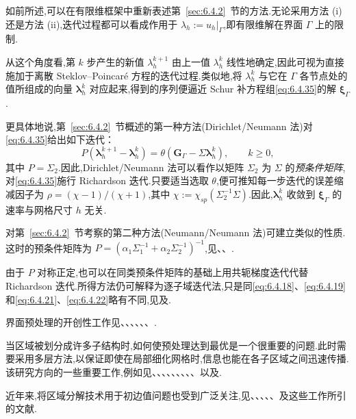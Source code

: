 如前所述,可以在有限维框架中重新表述第~\ref{sec:6.4.2}~节的方法.无论采用方法 (i) 还是方法 (ii),迭代过程都可以看成作用于 \(\lambda_h:=u_h|_\Gamma\),即有限维解在界面 \(\Gamma\) 上的限制.

从这个角度看,第 \(k\) 步产生的新值 \(\lambda_h^{k+1}\) 由上一值 \(\lambda_h^k\) 线性地确定,因此可视为直接施加于离散 Steklov--Poincaré 方程的迭代过程.类似地,将 \(\lambda_h^k\) 与它在 \(\Gamma\) 各节点处的值所组成的向量 \(\boldsymbol{\lambda}_h^k\) 对应起来,得到的序列便逼近 Schur 补方程组\eqref{eq:6.4.35}的解 \(\boldsymbol{\xi}_\Gamma\).

更具体地说,第~\ref{sec:6.4.2}~节概述的第一种方法(Dirichlet/Neumann 法)对\eqref{eq:6.4.35}给出如下迭代：
\begin{equation}\label{eq:6.4.40}
  P(\boldsymbol{\lambda}_h^{k+1}-\boldsymbol{\lambda}_h^k)
    =\theta(\boldsymbol{G}_\Gamma-\Sigma\boldsymbol{\lambda}_h^k),\qquad k\ge0,
\end{equation}
其中 \(P=\Sigma_2\).因此,Dirichlet/Neumann 法可以看作以矩阵 \(\Sigma_2\) 为 \(\Sigma\) 的\emph{预条件矩阵},对\eqref{eq:6.4.35}施行 Richardson 迭代.只要适当选取 \(\theta\),便可推知每一步迭代的误差缩减因子为 \(\rho=(\chi-1)/(\chi+1)\),其中 \(\chi:=\chi_{sp}(\Sigma_2^{-1}\Sigma)\).因此,\(\boldsymbol{\lambda}_h^k\) 收敛到 \(\boldsymbol{\xi}_\Gamma\) 的速率与网格尺寸 \(h\) 无关.

对第~\ref{sec:6.4.2}~节考察的第二种方法(Neumann/Neumann 法)可建立类似的性质.这时的预条件矩阵为 \(P=(\alpha_1\Sigma_1^{-1}+\alpha_2\Sigma_2^{-1})^{-1}\),见、、.

由于 \(P\) 对称正定,也可以在同类预条件矩阵的基础上用共轭梯度迭代代替 Richardson 迭代.所得方法仍可解释为逐子域迭代法,只是同\eqref{eq:6.4.18}、\eqref{eq:6.4.19}和\eqref{eq:6.4.21}、\eqref{eq:6.4.22}略有不同,见及.

界面预处理的开创性工作见、、、、、、.

当区域被划分成许多子结构时,如何使预处理达到最优是一个很重要的问题.此时需要采用多层方法,以保证即使在局部细化网格时,信息也能在各子区域之间迅速传播.该研究方向的一些重要工作,例如见、、、、、、、、、以及.

近年来,将区域分解技术用于初边值问题也受到广泛关注,见、、、、、及这些工作所引的文献.
